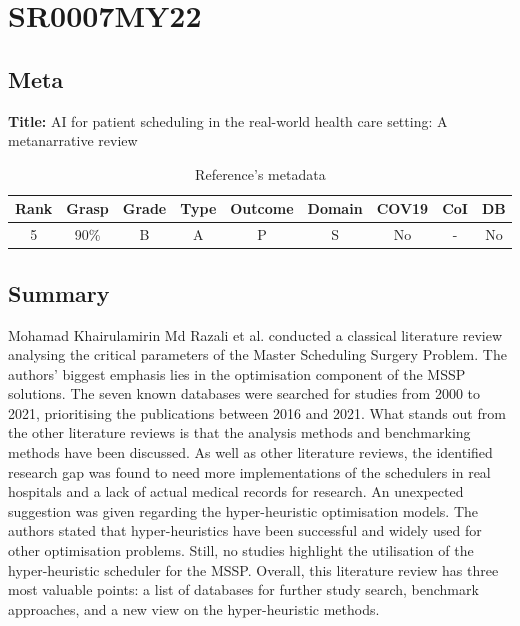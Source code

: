 \section{ SR0007MY22 }


\subsection{Meta}

    \textbf{Title:}
    AI for patient scheduling in the real-world health care setting: A metanarrative review

    \begin{table}[H]
        \centering
        \begin{tabular}{|c|c|c|c|c|c|c|c|c|}
            \hline
                \textbf{Rank} & \textbf{Grasp} & \textbf{Grade} & \textbf{Type} & \textbf{Outcome} & \textbf{Domain} & \textbf{COV19} & \textbf{CoI} & \textbf{DB} \\
            \hline
                5 & 90\% & B & A & P & S & No & - & No \\
            \hline
        \end{tabular}
        \caption{Reference's metadata}
        \label{tab:SR0007MY22}
    \end{table}

\subsection{Summary}
    Mohamad Khairulamirin Md Razali et al. conducted a classical literature review analysing the critical parameters of the Master Scheduling Surgery Problem. The authors' biggest emphasis lies in the optimisation component of the MSSP solutions. The seven known databases were searched for studies from 2000 to 2021, prioritising the publications between 2016 and 2021. What stands out from the other literature reviews is that the analysis methods and benchmarking methods have been discussed. As well as other literature reviews, the identified research gap was found to need more implementations of the schedulers in real hospitals and a lack of actual medical records for research. An unexpected suggestion was given regarding the hyper-heuristic optimisation models. The authors stated that hyper-heuristics have been successful and widely used for other optimisation problems. Still, no studies highlight the utilisation of the hyper-heuristic scheduler for the MSSP. Overall, this literature review has three most valuable points: a list of databases for further study search, benchmark approaches, and a new view on the hyper-heuristic methods.
    

